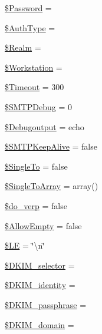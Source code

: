 \begin{DoxyCompactItemize}
\item 
\hyperlink{class_p_h_p_mailer_ae3ac8512c0fd8924c7112671ead08cf7}{\$\+Password} = \textquotesingle{}\textquotesingle{}
\item 
\hyperlink{class_p_h_p_mailer_afd91ef8cbbb4321e6d963b8189dc1f84}{\$\+Auth\+Type} = \textquotesingle{}\textquotesingle{}
\item 
\hyperlink{class_p_h_p_mailer_a992213fc362ebe731af595e6f4c7e49b}{\$\+Realm} = \textquotesingle{}\textquotesingle{}
\item 
\hyperlink{class_p_h_p_mailer_a4523ff0871ac0a83f9e05c700d40b2a2}{\$\+Workstation} = \textquotesingle{}\textquotesingle{}
\item 
\hyperlink{class_p_h_p_mailer_acaf3ec06f89f4024c5dbeb1a9ecf321c}{\$\+Timeout} = 300
\item 
\hyperlink{class_p_h_p_mailer_a5f952b7bed25b8423aec0a5b308d4bb1}{\$\+S\+M\+T\+P\+Debug} = 0
\item 
\hyperlink{class_p_h_p_mailer_a532f3412f3d97a106a36ff2b49409e42}{\$\+Debugoutput} = \textquotesingle{}echo\textquotesingle{}
\item 
\hyperlink{class_p_h_p_mailer_a7ff340050ca2061f7dc63b92e3f18586}{\$\+S\+M\+T\+P\+Keep\+Alive} = false
\item 
\hyperlink{class_p_h_p_mailer_a7c792e2e3e3cb98d869c9a68b73bc3a0}{\$\+Single\+To} = false
\item 
\hyperlink{class_p_h_p_mailer_a1a4e8b669019fd06e46df4ad0ef47ec4}{\$\+Single\+To\+Array} = array()
\item 
\hyperlink{class_p_h_p_mailer_abf2ec34ae2e6abd0f598ea202a8fa807}{\$do\+\_\+verp} = false
\item 
\hyperlink{class_p_h_p_mailer_a10c978cd1c0d14c12013ee1d7cd70bcb}{\$\+Allow\+Empty} = false
\item 
\hyperlink{class_p_h_p_mailer_a5ed269759d4ddf4fdf658930d93f69f7}{\$\+LE} = \char`\"{}\textbackslash{}n\char`\"{}
\item 
\hyperlink{class_p_h_p_mailer_ac21e5612fa66eeeee43467525e6c393d}{\$\+D\+K\+I\+M\+\_\+selector} = \textquotesingle{}\textquotesingle{}
\item 
\hyperlink{class_p_h_p_mailer_a677f605bf9bb29be802c5d17d8a0a22c}{\$\+D\+K\+I\+M\+\_\+identity} = \textquotesingle{}\textquotesingle{}
\item 
\hyperlink{class_p_h_p_mailer_a4f94813eecc8b5ebf32284d9a966f594}{\$\+D\+K\+I\+M\+\_\+passphrase} = \textquotesingle{}\textquotesingle{}
\item 
\hyperlink{class_p_h_p_mailer_a1e49cdb6cd38fc496bd5a93092cac0e7}{\$\+D\+K\+I\+M\+\_\+domain} = \textquotesingle{}\textquotesingle{}

\end{DoxyCompactItemize}
